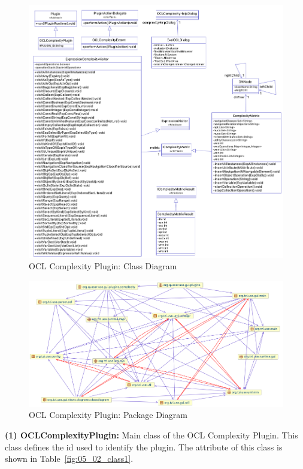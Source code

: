 \begin{figure}[ht]
    \centering
    \includegraphics[width=1\textwidth]{Chapters/figures/5_Implementation/02_ClassDiagram}
    \caption{OCL Complexity Plugin: Class Diagram}
    \label{fig:05_02_classdiagram}
\end{figure}

\begin{figure}[ht]
    \centering
    \includegraphics[width=1\textwidth]{Chapters/figures/5_Implementation/02_PackageDiagram}
    \caption{OCL Complexity Plugin: Package Diagram}
    \label{fig:05_02_packagediagram}
\end{figure}

\textbf{(1) OCLComplexityPlugin:} Main class of the OCL Complexity Plugin. This class defines the id used to identify the plugin. The attribute of this class is shown in Table~\ref{fig:05_02_class1}.

